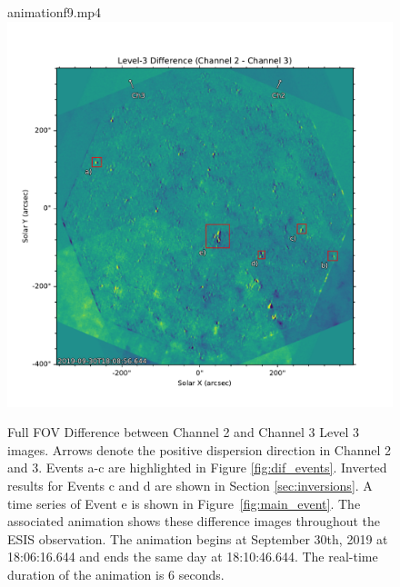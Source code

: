 \documentclass[linenumbers,trackchanges]{aastex63}
\begin{document}
   		
  		\begin{figure}
  			\begin{interactive}{animation}{f9.mp4}
  			\centering
  			\includegraphics{l3_dif}
  			\end{interactive}
  			\caption{Full FOV Difference between Channel 2 and Channel 3 Level 3 images.  
  			Arrows denote the positive dispersion direction in Channel 2 and 3.
  			Events a-c are highlighted in Figure \ref{fig:dif_events}.    
  			Inverted results for Events c and d are shown in Section \ref{sec:inversions}. 
  			A time series of Event e is shown in Figure~\ref{fig:main_event}.
The associated animation shows these difference images throughout the ESIS observation.	The animation begins at September 30th, 2019 at 18:06:16.644 and ends the same day at 18:10:46.644. The real-time duration of the animation is 6 seconds.
  	}
  			\label{fig:l3_dif}
  		\end{figure}
   	
\end{document}
